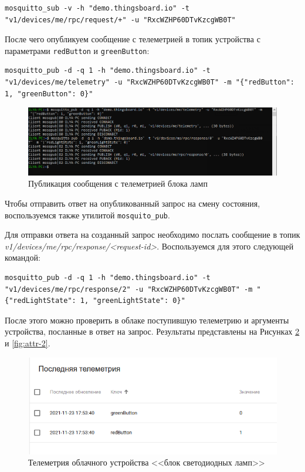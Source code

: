 \documentclass[a4paper,14pt]{extarticle}
\begin{document}
\begin{lstlisting}
mosquitto_sub -v -h "demo.thingsboard.io" -t "v1/devices/me/rpc/request/+" -u "RxcWZHP60DTvKzcgWB0T"
\end{lstlisting}

После чего опубликуем сообщение с телеметрией в топик устройства с параметрами
\texttt{redButton} и \texttt{greenButton}:

\begin{lstlisting}
mosquitto_pub -d -q 1 -h "demo.thingsboard.io" -t "v1/devices/me/telemetry" -u "RxcWZHP60DTvKzcgWB0T" -m "{"redButton": 1, "greenButton": 0}"
\end{lstlisting}

\begin{figure}[h!]
	\centering
	\includegraphics[width=0.6\linewidth]{images/t2-sender}
	\caption{Публикация сообщения с телеметрией блока ламп}
	\label{fig:t2-sender}
\end{figure}

Чтобы отправить ответ на опубликованный запрос на смену состояния, воспользуемся
также утилитой \texttt{mosquito\_pub}.

Для отправки ответа на созданный запрос необходимо послать сообщение в топик
\textit{v1/devices/me/rpc/response/<request-id>}. Воспользуемся для этого следующей командой:

\begin{lstlisting}
mosquitto_pub -d -q 1 -h "demo.thingsboard.io" -t "v1/devices/me/rpc/response/2" -u "RxcWZHP60DTvKzcgWB0T" -m "{"redLightState": 1, "greenLightState": 0}"
\end{lstlisting}

После этого можно проверить в облаке поступившую телеметрию и аргументы устройства,
посланные в ответ на запрос. Результаты представлены на Рисунках \ref{fig:tel-2} и \ref{fig:attr-2}.

\begin{figure}[h!]
	\centering
	\includegraphics[width=0.6\linewidth]{images/tel-2}
	\caption{Телеметрия облачного устройства <<блок светодиодных ламп>>}
	\label{fig:tel-2}
\end{figure}
\end{document}
